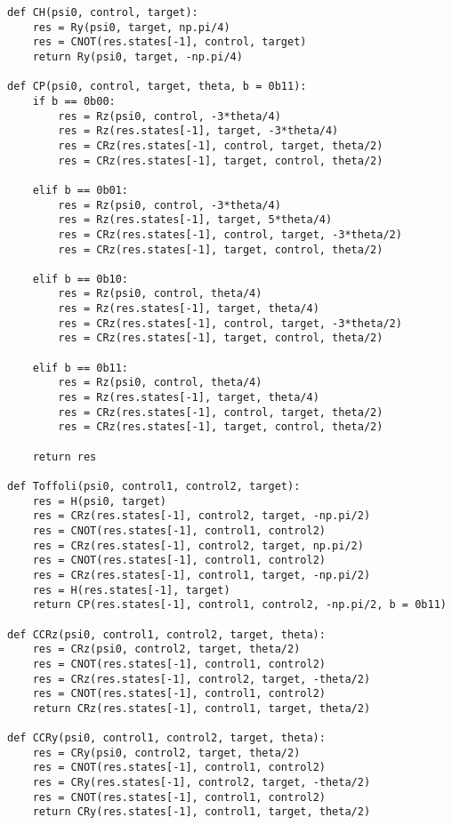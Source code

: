 \begin{verbatim}
def CH(psi0, control, target):
    res = Ry(psi0, target, np.pi/4)
    res = CNOT(res.states[-1], control, target)
    return Ry(psi0, target, -np.pi/4)

def CP(psi0, control, target, theta, b = 0b11):
    if b == 0b00:
        res = Rz(psi0, control, -3*theta/4)
        res = Rz(res.states[-1], target, -3*theta/4)
        res = CRz(res.states[-1], control, target, theta/2)
        res = CRz(res.states[-1], target, control, theta/2)

    elif b == 0b01:
        res = Rz(psi0, control, -3*theta/4)
        res = Rz(res.states[-1], target, 5*theta/4)
        res = CRz(res.states[-1], control, target, -3*theta/2)
        res = CRz(res.states[-1], target, control, theta/2)

    elif b == 0b10:
        res = Rz(psi0, control, theta/4)
        res = Rz(res.states[-1], target, theta/4)
        res = CRz(res.states[-1], control, target, -3*theta/2)
        res = CRz(res.states[-1], target, control, theta/2)

    elif b == 0b11:
        res = Rz(psi0, control, theta/4)
        res = Rz(res.states[-1], target, theta/4)
        res = CRz(res.states[-1], control, target, theta/2)
        res = CRz(res.states[-1], target, control, theta/2)

    return res

def Toffoli(psi0, control1, control2, target):
    res = H(psi0, target)
    res = CRz(res.states[-1], control2, target, -np.pi/2)
    res = CNOT(res.states[-1], control1, control2)
    res = CRz(res.states[-1], control2, target, np.pi/2)
    res = CNOT(res.states[-1], control1, control2)
    res = CRz(res.states[-1], control1, target, -np.pi/2)
    res = H(res.states[-1], target)
    return CP(res.states[-1], control1, control2, -np.pi/2, b = 0b11)

def CCRz(psi0, control1, control2, target, theta):
    res = CRz(psi0, control2, target, theta/2)
    res = CNOT(res.states[-1], control1, control2)
    res = CRz(res.states[-1], control2, target, -theta/2)
    res = CNOT(res.states[-1], control1, control2)
    return CRz(res.states[-1], control1, target, theta/2)

def CCRy(psi0, control1, control2, target, theta):
    res = CRy(psi0, control2, target, theta/2)
    res = CNOT(res.states[-1], control1, control2)
    res = CRy(res.states[-1], control2, target, -theta/2)
    res = CNOT(res.states[-1], control1, control2)
    return CRy(res.states[-1], control1, target, theta/2)


\end{verbatim}
